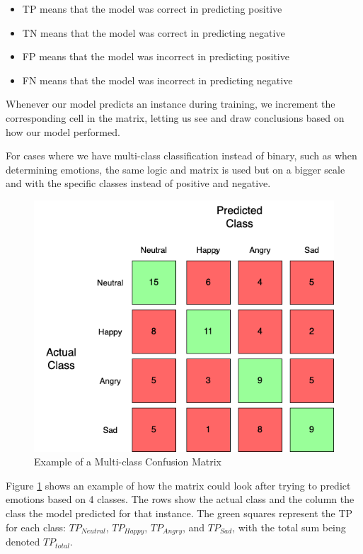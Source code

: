 \documentclass[nofilelist]{cslthse-msc}
\begin{document}
\begin{itemize}
    \item TP means that the model was correct in predicting positive
    \item TN means that the model was correct in predicting negative
    \item FP means that the model was incorrect in predicting positive
    \item FN means that the model was incorrect in predicting negative
\end{itemize}

Whenever our model predicts an instance during training, we increment the corresponding cell in the matrix, letting us see and draw conclusions based on how our model performed. 


For cases where we have multi-class classification instead of binary, such as when determining emotions, the same logic and matrix is used but on a bigger scale and with the specific classes instead of positive and negative. 
\begin{figure}[h!]
    \centering
    \hspace*{-4cm}\includegraphics[width=\textwidth/4*3]{msccls/explanatory_images/Multiclass_conf.png}
    \caption{Example of a Multi-class Confusion Matrix}
    \label{fig:multi_confusion}
\end{figure}
Figure \ref{fig:multi_confusion} shows an example of how the matrix could look after trying to predict emotions based on 4 classes. The rows show the actual class and the column the class the model predicted for that instance. The green squares represent the TP for each class: $TP_{Neutral}$, $TP_{Happy}$, $TP_{Angry}$, and $TP_{Sad}$, with the total sum being denoted $TP_{total}$.
\end{document}
